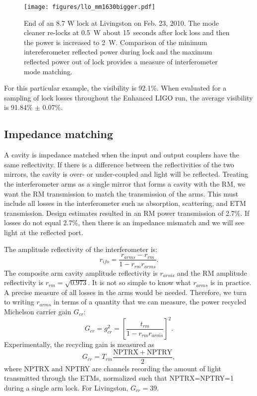 \begin{figure}
\begin{centering}
\texttt{[image: figures/llo\_mm1630bigger.pdf]}
\caption[End of an 8.7 W lock at Livingston on Feb. 23, 2010]{End of
  an 8.7 W lock at Livingston on Feb. 23, 2010. The mode cleaner
  re-locks at 0.5~W about 15~seconds after lock loss and then the
  power is increased to 2~W. Comparison of the minimum intereferometer
  reflected power during lock and the maximum reflected power out of
  lock provides a measure of interferometer mode matching.}
\label{fig:llomm1630}
\end{centering}
\end{figure}

For this particular example, the visibility is 92.1\%.  When evaluated
for a sampling of lock losses throughout the Enhanced LIGO run, the
average visibility is 91.84\% $\pm$ 0.07\%.





\subsection{Impedance matching}
A cavity is impedance matched when the input and output couplers have
the same reflectivity. If there is a difference between the
reflectivities of the two mirrors, the cavity is over- or
under-coupled and light will be reflected. Treating the interferometer
arms as a single mirror that forms a cavity with the RM, we want the
RM transmission to match the transmission of the arms. This must
include all losses in the interferometer such as absorption,
scattering, and ETM transmission. Design estimates resulted in an RM
power transmission of 2.7\%. If losses do not equal 2.7\%, then there is an impedance mismatch and
we will see light at the reflected port. 

The amplitude reflectivity of the interferometer is:
\begin{equation} 
r_{ifo} = \frac{r_{arms}-r_{rm}}{1-r_{rm}r_{arms}}.
\end{equation}
The composite arm cavity amplitude reflectivity is $r_{arms}$ and the
RM amplitude reflectivity is $r_{rm} = \sqrt{0.973}$.  It is not so
simple to know what $r_{arms}$ is in practice. A precise measure of
all losses in the arms would be needed. Therefore, we turn to writing
$r_{arms}$ in terms of a quantity that we can measure, the power
recycled Michelson carrier gain $G_{cr}$:
\begin{equation}
G_{cr} = g_{cr}^2 = \left[\frac{t_{rm}}{1-r_{rm}r_{arms}}\right]^2.
\end{equation}
Experimentally, the recycling gain is measured as
\begin{equation}
G_{cr} = T_{rm} \frac{\mathrm{NPTRX + NPTRY}}{2},
\end{equation}
where NPTRX and NPTRY are channels recording the amount of light
transmitted through the ETMs, normalized such that NPTRX=NPTRY=1
during a single arm lock. For Livingston, $G_{cr} = 39$.

